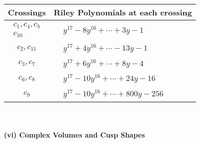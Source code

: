 \documentclass[1p]{elsarticle_modified}
\theoremstyle{definition}
\begin{document}
\begin{tabular}{m{50pt}|m{274pt}}
Crossings & \hspace{64pt}Riley Polynomials at each crossing \\
\hline $$\begin{aligned}c_{1},c_{4},c_{5}\\c_{10}\end{aligned}$$&$\begin{aligned}
&y^{17}-8 y^{16}+\cdots+3 y-1
\end{aligned}$\\
\hline $$\begin{aligned}c_{2},c_{11}\end{aligned}$$&$\begin{aligned}
&y^{17}+4 y^{16}+\cdots-13 y-1
\end{aligned}$\\
\hline $$\begin{aligned}c_{3},c_{7}\end{aligned}$$&$\begin{aligned}
&y^{17}+6 y^{16}+\cdots+8 y-4
\end{aligned}$\\
\hline $$\begin{aligned}c_{6},c_{8}\end{aligned}$$&$\begin{aligned}
&y^{17}-10 y^{16}+\cdots+24 y-16
\end{aligned}$\\
\hline $$\begin{aligned}c_{9}\end{aligned}$$&$\begin{aligned}
&y^{17}-10 y^{16}+\cdots+800 y-256
\end{aligned}$\\
\hline
\end{tabular}\\~\\
\newpage\flushleft \textbf{(vi) Complex Volumes and Cusp Shapes}
\end{document}
